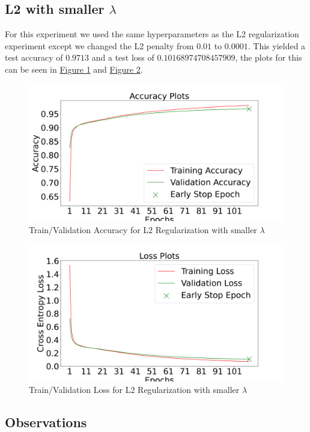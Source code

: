 \documentclass{article}
\begin{document}
\subsection{L2 with smaller $\lambda$}
For this experiment we used the same hyperparameters as the L2 regularization
experiment except we changed the L2 penalty from $0.01$ to $0.0001$. This yielded
a test accuracy of $0.9713$ and a test loss of $0.10168974708457909$, 
the plots for this can be seen in \hyperref[fig:l2_2_acc]{Figure \ref{fig:l2_2_acc}} and
\hyperref[fig:l2_2_loss]{Figure \ref{fig:l2_2_loss}}.

\begin{figure}[h!]
  \centering
  \includegraphics[width=0.8\linewidth]{include/reg-exp-l2-2-acc.png}
  \caption{Train/Validation Accuracy for L2 Regularization with smaller $\lambda$}
  \label{fig:l2_2_acc}
\end{figure}

\begin{figure}[h!]
  \centering
  \includegraphics[width=0.8\linewidth]{include/reg-exp-l2-2-loss.png}
  \caption{Train/Validation Loss for L2 Regularization with smaller $\lambda$}
  \label{fig:l2_2_loss}
\end{figure}
\newpage
\subsection{Observations}
\end{document}
